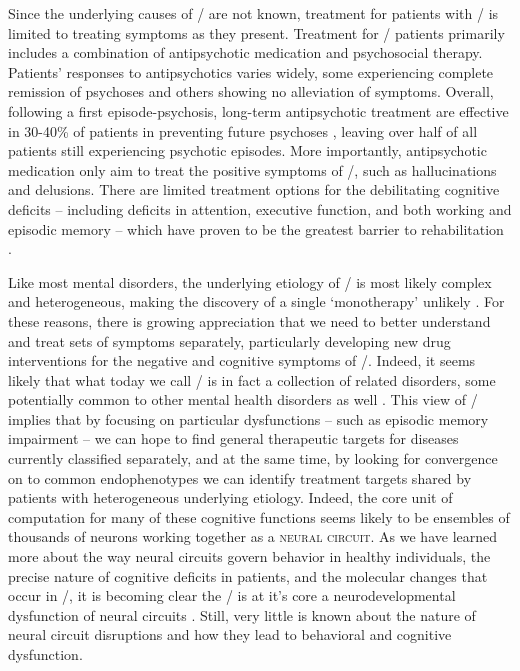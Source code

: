 Since the underlying causes of \scz/ are not known, treatment for patients with \scz/ is limited to treating symptoms as they present.
Treatment for \scz/ patients primarily includes a combination of antipsychotic medication and psychosocial therapy.
Patients' responses to antipsychotics varies widely, some experiencing complete remission of psychoses and others showing no alleviation of symptoms.
Overall, following a first episode-psychosis, long-term antipsychotic treatment are effective in 30-40\% of patients in preventing future psychoses \citep{Boyer2007, Insel2010a}, leaving over half of all patients still experiencing psychotic episodes.
More importantly, antipsychotic medication only aim to treat the positive symptoms of \scz/, such as hallucinations and delusions.
There are limited treatment options for the debilitating cognitive deficits -- including deficits in attention, executive function, and both working and episodic memory -- which have proven to be the greatest barrier to rehabilitation \citep{Lieberman2005, Harrison2001, O'Carroll2000, Hyman2003}.

Like most mental disorders, the underlying etiology of \scz/ is most likely complex and heterogeneous, making the discovery of a single `monotherapy' unlikely \citep{Hyman2003}.
For these reasons, there is growing appreciation that we need to better understand and treat sets of symptoms separately, particularly developing new drug interventions for the negative and cognitive symptoms of \scz/.
Indeed, it seems likely that what today we call \scz/ is in fact a collection of related disorders, some potentially common to other mental health disorders as well \citep{Insel2010a}.
This view of \scz/ implies that by focusing on particular dysfunctions -- such as episodic memory impairment -- we can hope to find general therapeutic targets for diseases currently classified separately, and at the same time, by looking for convergence on to common endophenotypes we can identify treatment targets shared by patients with heterogeneous underlying etiology.
Indeed, the core unit of computation for many of these cognitive functions seems likely to be ensembles of thousands of neurons working together as a \textsc{neural circuit}.
As we have learned more about the way neural circuits govern behavior in healthy individuals, the precise nature of cognitive deficits in patients, and the molecular changes that occur in \scz/, it is becoming clear the \scz/ is at it's core a neurodevelopmental dysfunction of neural circuits \citep{Arguello2012, Insel2010a, Insel2010b, Lewis2002}.
Still, very little is known about the nature of neural circuit disruptions and how they lead to behavioral and cognitive dysfunction.

